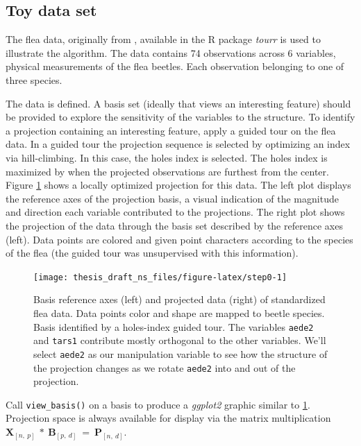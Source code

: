 \documentclass{monashthesis}
\begin{document}
\hypertarget{toy-data-set}{%
\subsection{Toy data set}\label{toy-data-set}}

The flea data, originally from \textcite{lubischew_use_1962}, available in the R package \emph{tourr} \autocite{wickham_tourr_2011} is used to illustrate the algorithm. The data contains 74 observations across 6 variables, physical measurements of the flea beetles. Each observation belonging to one of three species.

The data is defined. A basis set (ideally that views an interesting feature) should be provided to explore the sensitivity of the variables to the structure. To identify a projection containing an interesting feature, apply
a guided tour\autocite{cook_interactive_2007} on the flea data. In a guided tour the projection sequence is selected by optimizing an index via hill-climbing. In this case, the holes index is selected. The holes index is maximized by when the projected observations are furthest from the center. Figure \ref{fig:step0} shows a locally optimized projection for this data. The left plot displays the reference axes of the projection basis, a visual indication of the magnitude and direction each variable contributed to the projections. The right plot shows the projection of the data through the basis set described by the reference axes (left). Data points are colored and given point characters according to the species of the flea (the guided tour was unsupervised with this information).



\begin{figure}

{\centering \texttt{[image: thesis\_draft\_ns\_files/figure-latex/step0-1]} 

}

\caption{Basis reference axes (left) and projected data (right) of standardized flea data. Data points color and shape are mapped to beetle species. Basis identified by a holes-index guided tour. The variables \texttt{aede2} and \texttt{tars1} contribute mostly orthogonal to the other variables. We'll select \texttt{aede2} as our manipulation variable to see how the structure of the projection changes as we rotate \texttt{aede2} into and out of the projection.}\label{fig:step0}
\end{figure}

Call \texttt{view\_basis()} on a basis to produce a \emph{ggplot2} graphic similar to \ref{fig:step0}. Projection space is always available for display via the matrix multiplication \(\textbf{X}_{[n,~p]} ~*~ \textbf{B}_{[p,~d]} ~=~ \textbf{P}_{[n,~d]}\).
\end{document}
